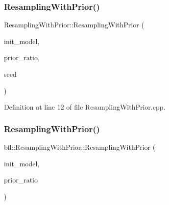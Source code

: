 \subsubsection{\texorpdfstring{Resampling\+With\+Prior()}{ResamplingWithPrior()}\hspace{0.1cm}{\footnotesize\ttfamily [1/4]}}
{\footnotesize\ttfamily Resampling\+With\+Prior\+::\+Resampling\+With\+Prior (\begin{DoxyParamCaption}\item[{std\+::unique\+\_\+ptr$<$ \mbox{\hyperlink{classbfl_1_1ParticleSetInitialization}{bfl\+::\+Particle\+Set\+Initialization}} $>$}]{init\+\_\+model,  }\item[{const double}]{prior\+\_\+ratio,  }\item[{const unsigned int}]{seed }\end{DoxyParamCaption})\hspace{0.3cm}{\ttfamily [noexcept]}}



Definition at line 12 of file Resampling\+With\+Prior.\+cpp.

\mbox{\label{classbfl_1_1ResamplingWithPrior_a8f6527d29c4c92c0ad213c4bd21b17da}} 
\subsubsection{\texorpdfstring{Resampling\+With\+Prior()}{ResamplingWithPrior()}\hspace{0.1cm}{\footnotesize\ttfamily [2/4]}}
{\footnotesize\ttfamily bfl\+::\+Resampling\+With\+Prior\+::\+Resampling\+With\+Prior (\begin{DoxyParamCaption}\item[{std\+::unique\+\_\+ptr$<$ \mbox{\hyperlink{classbfl_1_1ParticleSetInitialization}{bfl\+::\+Particle\+Set\+Initialization}} $>$}]{init\+\_\+model,  }\item[{const double}]{prior\+\_\+ratio }\end{DoxyParamCaption})\hspace{0.3cm}{\ttfamily [noexcept]}}

\mbox{\label{classbfl_1_1ResamplingWithPrior_aefd4984732a28b95cc6460ae853e828a}} 
